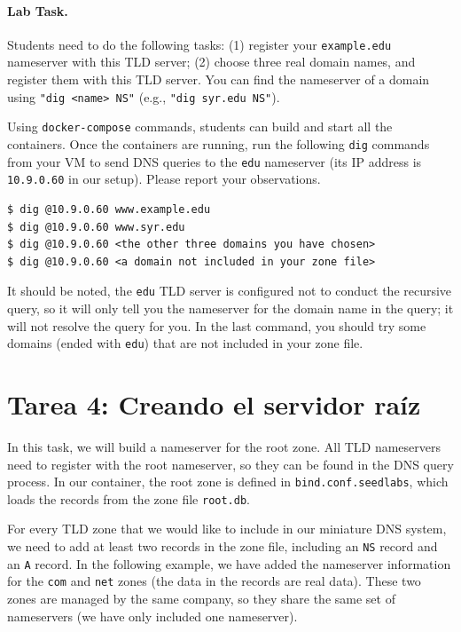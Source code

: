 \paragraph{Lab Task.}
Students need to do the following tasks: (1) register 
your \texttt{example.edu} nameserver with this TLD server;
(2) choose three real domain names, and register them
with this TLD server. You can find the nameserver of a domain
using \texttt{"dig <name> NS"} (e.g., \texttt{"dig syr.edu NS"}). 


Using \texttt{docker-compose} commands, students can 
build and start all the containers. 
Once the containers are running,
run the following \texttt{dig} commands from your VM to
send DNS queries to the \texttt{edu} nameserver (its IP address
is \texttt{10.9.0.60} in our setup). 
Please report your observations. 


\begin{lstlisting}
$ dig @10.9.0.60 www.example.edu
$ dig @10.9.0.60 www.syr.edu
$ dig @10.9.0.60 <the other three domains you have chosen>
$ dig @10.9.0.60 <a domain not included in your zone file>
\end{lstlisting}

It should be noted, the \texttt{edu} TLD server is configured 
not to conduct the recursive query, so it will only tell you
the nameserver for the domain name in the query; it will not
resolve the query for you. In the last command, you should
try some domains (ended with \texttt{edu}) that are not included in your zone file. 


\section{Tarea 4: Creando el servidor raíz}


In this task, we will build a nameserver for the 
root zone. All TLD nameservers need to register
with the root nameserver, so they can be found
in the DNS query process. 
In our container, the root zone is defined in 
\texttt{bind.conf.seedlabs}, which loads the records 
from the zone file \texttt{root.db}. 


For every TLD zone that we would like to include in our 
miniature DNS system, we need to add at least two records
in the zone file, including an \texttt{NS} record 
and an \texttt{A} record.  In the following example,
we have added the nameserver information for the 
\texttt{com} and \texttt{net} zones (the data in the records are real data).
These two zones are managed by the same company, so they share the 
same set of nameservers (we have only included one nameserver).

